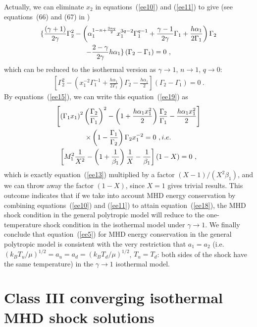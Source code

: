 \documentclass[fleqn,usenatbib]{mnras}
\begin{document}
Actually, we can eliminate $x_{2}$ in equations~(\ref{ee10}) and (\ref{ee11}) to give (see equations~(66) and (67) in \citet{wang2008dynamic})
\begin{gather}
\lbrace \frac{(\gamma+1)}{2\gamma}\Gamma_{2}^{2}-\left(\alpha_{1}^{1-n+\frac{3nq}{2}}x_{1}^{3q-2}\Gamma_{1}^{q-1}+\frac{\gamma-1}{2\gamma}\Gamma_{1}+\frac{h\alpha_{1}}{2\Gamma_{1}}\right)\Gamma_{2}\notag\\
-\frac{2-\gamma}{2\gamma}h\alpha_{1}\rbrace \left(\Gamma_{2}-\Gamma_{1}\right)=0\ ,\label{ee18}
\end{gather}
which can be reduced to the isothermal version as $\gamma\rightarrow 1$, $n\rightarrow 1$, $q\rightarrow 0$:
\begin{gather}
\left[\Gamma_{2}^{2}-\left(x_{1}^{-2}\Gamma_{1}^{-1}+\frac{h\alpha_{1}}{2\Gamma_{1}}\right)\Gamma_{2}-\frac{h\alpha_{1}}{2}\right]\left(\Gamma_{2}-\Gamma_{1}\right)=0\ .\label{ee19}
\end{gather}
By equations~(\ref{ee15}), we can write this equation~(\ref{ee19}) as
\begin{gather}
\left[\left(\Gamma_{1}x_{1}\right)^{2}\left(\frac{\Gamma_{2}}{\Gamma_{1}}\right)^{2}-\left(1+\frac{h\alpha_{1}x_{1}^{2}}{2}\right)\frac{\Gamma_{2}}{\Gamma_{1}}-\frac{h\alpha_{1}x_{1}^{2}}{2}\right]\notag\\
\times \left(1-\frac{\Gamma_{1}}{\Gamma_{2}}\right)\Gamma_{2}x_{1}^{-2}=0\ , i.e.\notag\\
\left[M_{1}^{2}\frac{1}{X^{2}}-\left(1+\frac{1}{\beta_{1}}\right)\frac{1}{X}-\frac{1}{\beta_{1}}\right](1-X)=0\ ,\label{ee20}
\end{gather}
which is exactly equation~(\ref{ee13}) multiplied by a factor $(X-1)/\left(X^{2}\beta_{1}\right)$, and we can throw away the factor $\left(1-X\right)$, since $X=1$ gives trivial results. This outcome indicates that if we take into account MHD energy conservation by combining equations~(\ref{ee10}) and (\ref{ee11}) to attain equation~(\ref{ee18}), the MHD shock condition in the general polytropic model will reduce to the one-temperature shock condition in the isothermal model under $\gamma\rightarrow 1$. We finally conclude that equation~(\ref{ee5}) for MHD energy conservation in the general polytropic model is consistent with the very restriction that $a_{1}=a_{2}$ (i.e. $\left(k_{B}T_{u}/\mu\right)^{1/2}=a_{u}=a_{d}=\left(k_{B}T_{d}/\mu\right)^{1/2}$, $T_{u}=T_{d}$: both sides of the shock have the same temperature) in the $\gamma\rightarrow 1$ isothermal model. 

\section{Class III converging isothermal MHD shock solutions}
\label{a4}
\end{document}
